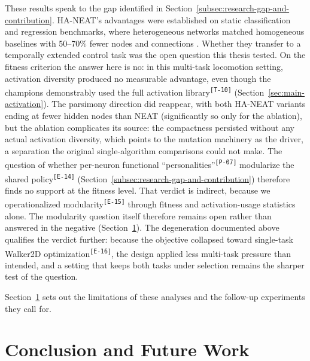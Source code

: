 \documentclass[12pt]{article}
\newcommand{\revID}[1]{\textsuperscript{\scriptsize\texttt{[#1]}}}
\newcommand{\revPlain}[2]{\textcolor{lrGreen}{#2}\revID{#1}}    %
\newcommand{\revBrit}[2]{\textcolor{lrBlue}{#2}\revID{#1}}      %
\newcommand{\revTerm}[2]{\textcolor{lrTeal}{#2}\revID{#1}}      %
\begin{document}
These results speak to the gap identified in Section~\ref{subsec:research-gap-and-contribution}.
HA-NEAT's advantages were established on static classification and regression benchmarks, where heterogeneous networks matched homogeneous baselines with 50--70\% fewer nodes and connections \parencite{hagg_evolving_2017}. Whether they transfer to a temporally extended control task was the open question this thesis tested.
On the fitness criterion the answer here is no: in this multi-task locomotion setting, activation diversity produced no measurable advantage, even though the champions demonstrably \revTerm{T-10}{used the full activation library} (Section~\ref{sec:main-activation}).
The parsimony direction did reappear, with both HA-NEAT variants ending at fewer hidden nodes than NEAT (significantly so only for the ablation), but the ablation complicates its source: the compactness persisted without any actual activation diversity, which points to the mutation machinery as the driver, a separation the original single-algorithm comparisons could not make.
The question of whether per-neuron \revPlain{P-07}{functional ``personalities''} \revBrit{E-14}{modularize the shared policy} (Section~\ref{subsec:research-gap-and-contribution}) therefore finds no support at the fitness level.
That verdict is indirect, because \revBrit{E-15}{we operationalized modularity} through fitness and activation-usage statistics alone. The modularity question itself therefore remains open rather than answered in the negative (Section~\ref{sec:conclusion-and-future-work}).
The degeneration documented above qualifies the verdict further: because the objective collapsed toward \revBrit{E-16}{single-task Walker2D optimization}, the design applied less multi-task pressure than intended, and a setting that keeps both tasks under selection remains the sharper test of the question.

Section~\ref{sec:conclusion-and-future-work} sets out the limitations of these analyses and the follow-up experiments they call for.




\section{Conclusion and Future Work}
\label{sec:conclusion-and-future-work}
\end{document}

